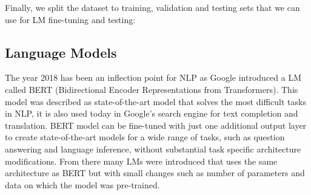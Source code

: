 \documentclass[conference]{IEEEtran}
\begin{document}
\begin{table}[htp]
\centering
{}
\vspace{0.4cm}
\caption{Examples of FEVER claims and labels.}
\label{tab:fever_example}
\end{table}

Finally, we split the dataset to training, validation and testing sets that we can use for LM fine-tuning and testing:

\begin{table}[htp]
\centering
{}
\vspace{0.4cm}
\caption{Dataset split sizes for SUPPORTS, REFUTES and NOTENOUGHINFO (NEI) classes.}
\label{tab:fever_splits}
\end{table}

\subsection{Language Models}
The year 2018 has been an inflection point for NLP as Google introduced a LM called BERT (Bidirectional Encoder Representations from Transformers)\cite{devlin2018bert}. This model was described as state-of-the-art model that solves the most difficult tasks in NLP, it is also used today in Google's search engine for text completion and translation. BERT model can be fine-tuned with just one additional output layer to create state-of-the-art models for a wide range of tasks, such as question answering and language inference, without substantial task specific architecture modifications. From there many LMs were introduced that uses the same architecture as BERT but with small changes such as number of parameters and data on which the model was pre-trained.
\end{document}
